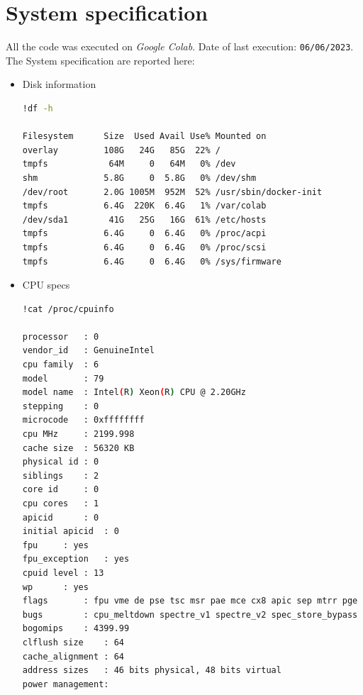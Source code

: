\documentclass[12pt,english]{report}
\begin{document}
\section{System specification}\label{sec:sysspec}
All the code was executed on \textit{Google Colab}. Date of last execution: \texttt{06/06/2023}. The System specification are reported here:
\begin{itemize}
\item Disk information
\begin{lstlisting}[language={bash},label={lst:diskinfo},caption={Disk information}]
!df -h

Filesystem      Size  Used Avail Use% Mounted on
overlay         108G   24G   85G  22% /
tmpfs            64M     0   64M   0% /dev
shm             5.8G     0  5.8G   0% /dev/shm
/dev/root       2.0G 1005M  952M  52% /usr/sbin/docker-init
tmpfs           6.4G  220K  6.4G   1% /var/colab
/dev/sda1        41G   25G   16G  61% /etc/hosts
tmpfs           6.4G     0  6.4G   0% /proc/acpi
tmpfs           6.4G     0  6.4G   0% /proc/scsi
tmpfs           6.4G     0  6.4G   0% /sys/firmware
\end{lstlisting}
\item CPU specs
\begin{lstlisting}[language={bash},label={lst:cpuspec},caption={CPU spec}]
!cat /proc/cpuinfo

processor	: 0
vendor_id	: GenuineIntel
cpu family	: 6
model		: 79
model name	: Intel(R) Xeon(R) CPU @ 2.20GHz
stepping	: 0
microcode	: 0xffffffff
cpu MHz		: 2199.998
cache size	: 56320 KB
physical id	: 0
siblings	: 2
core id		: 0
cpu cores	: 1
apicid		: 0
initial apicid	: 0
fpu		: yes
fpu_exception	: yes
cpuid level	: 13
wp		: yes
flags		: fpu vme de pse tsc msr pae mce cx8 apic sep mtrr pge mca cmov pat pse36 clflush mmx fxsr sse sse2 ss ht syscall nx pdpe1gb rdtscp lm constant_tsc rep_good nopl xtopology nonstop_tsc cpuid tsc_known_freq pni pclmulqdq ssse3 fma cx16 pcid sse4_1 sse4_2 x2apic movbe popcnt aes xsave avx f16c rdrand hypervisor lahf_lm abm 3dnowprefetch invpcid_single ssbd ibrs ibpb stibp fsgsbase tsc_adjust bmi1 hle avx2 smep bmi2 erms invpcid rtm rdseed adx smap xsaveopt arat md_clear arch_capabilities
bugs		: cpu_meltdown spectre_v1 spectre_v2 spec_store_bypass l1tf mds swapgs taa mmio_stale_data retbleed
bogomips	: 4399.99
clflush size	: 64
cache_alignment	: 64
address sizes	: 46 bits physical, 48 bits virtual
power management:


\end{lstlisting}
\end{itemize}
\end{document}
